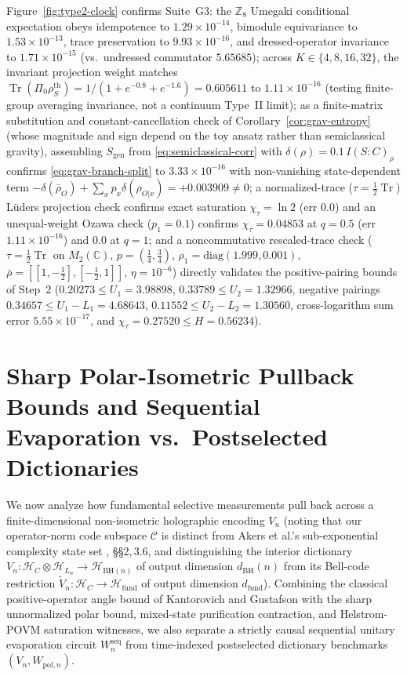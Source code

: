 \documentclass[11pt,a4paper]{article}
\theoremstyle{definition}
\theoremstyle{remark}
\newcommand{\Tr}{\operatorname{Tr}}
\newcommand{\cH}{\mathcal{H}}
\newcommand{\cC}{\mathcal{C}}
\newcommand{\bbC}{\mathbb{C}}
\newcommand{\bbZ}{\mathbb{Z}}
\newcommand{\1}{\mathbf{1}}
\begin{document}
Figure~\ref{fig:type2-clock} confirms Suite~G3: the $\bbZ_8$ Umegaki conditional expectation obeys idempotence to $1.29\times 10^{-14}$, bimodule equivariance to $1.53\times 10^{-13}$, trace preservation to $9.93\times 10^{-16}$, and dressed-operator invariance to $1.71\times 10^{-15}$ (vs.\ undressed commutator $5.65685$); across $K\in\{4,8,16,32\}$, the invariant projection weight matches $\Tr(\Pi_0\rho_S^{\mathrm{th}})=1/(1+e^{-0.8}+e^{-1.6})=0.605611$ to $1.11\times 10^{-16}$ (testing finite-group averaging invariance, not a continuum Type~II limit); as a finite-matrix substitution and constant-cancellation check of Corollary~\ref{cor:grav-entropy} (whose magnitude and sign depend on the toy ansatz rather than semiclassical gravity), assembling $S_{\mathrm{gen}}$ from \eqref{eq:semiclassical-corr} with $\delta(\rho)=0.1\,I(S:C)_\rho$ confirms \eqref{eq:grav-branch-split} to $3.33\times 10^{-16}$ with non-vanishing state-dependent term $-\delta(\bar{\rho}_O)+\sum_x p_x\delta(\rho_{O|x})=+0.003909\neq 0$; a normalized-trace ($\tau=\frac{1}{2}\Tr$) L\"uders projection check confirms exact saturation $\chi_\tau=\ln 2$ (err $0.0$) and an unequal-weight Ozawa check ($p_1=0.1$) confirms $\chi_\tau=0.04853$ at $q=0.5$ (err $1.11\times 10^{-16}$) and $0.0$ at $q=1$; and a noncommutative rescaled-trace check ($\tau=\frac{1}{2}\Tr$ on $M_2(\bbC)$, $p=(\frac{1}{4},\frac{3}{4})$, $\rho_1=\mathrm{diag}(1.999,0.001)$, $\bar{\rho}=[[1,-\frac{1}{2}],[-\frac{1}{2},1]]$, $\eta=10^{-6}$) directly validates the positive-pairing bounds of Step~2 ($0.20273\le U_1=3.98898$, $0.33789\le U_2=1.32966$, negative pairings $0.34657\le U_1-L_1=4.68643$, $0.11552\le U_2-L_2=1.30560$, cross-logarithm sum error $5.55\times 10^{-17}$, and $\chi_\tau=0.27520\le H=0.56234$).

\section{Sharp Polar-Isometric Pullback Bounds and Sequential Evaporation vs.\ Postselected Dictionaries}\label{sec:nonisometric}

We now analyze how fundamental selective measurements pull back across a finite-dimensional non-isometric holographic encoding $V_u$ \cite{Akers2024} (noting that our operator-norm code subspace $\cC$ is distinct from Akers et al.'s sub-exponential complexity state set \cite{Akers2024}, \S\S2,\,3.6, and distinguishing the interior dictionary $V_n:\cH_C\otimes\cH_{L_n}\to\cH_{\mathrm{BH}(n)}$ of output dimension $d_{\mathrm{BH}}(n)$ from its Bell-code restriction $\tilde{V}_n:\cH_C\to\cH_{\mathrm{fund}}$ of output dimension $d_{\mathrm{fund}}$). Combining the classical positive-operator angle bound of Kantorovich \cite{Kantorovich1948} and Gustafson \cite{Gustafson1968} with the sharp unnormalized polar bound, mixed-state purification contraction, and Helstrom-POVM saturation witnesses, we also separate a strictly causal sequential unitary evaporation circuit $W_n^{\mathrm{seq}}$ from time-indexed postselected dictionary benchmarks $(V_n,W_{\mathrm{pol},n})$.
\end{document}

